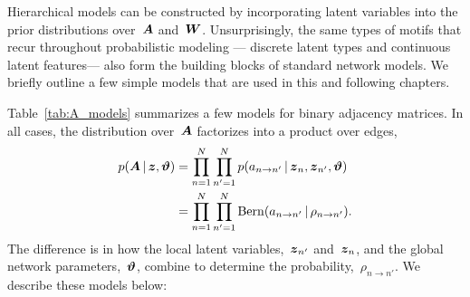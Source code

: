 Hierarchical models can be constructed by incorporating latent
variables into the prior distributions over~$\boldsymbol{A}$ and~$\boldsymbol{W}$.
Unsurprisingly, the same types of motifs that recur throughout
probabilistic modeling --- discrete latent types and continuous
latent features--- also form the building blocks of
standard network models.  We briefly outline a few simple models that
are used in this and following chapters.

Table~\ref{tab:A_models} summarizes a few models for binary adjacency
matrices. In all cases, the distribution over~$\boldsymbol{A}$ factorizes into a
product over edges,
\begin{align*}
  p(\boldsymbol{A} \,|\, \boldsymbol{z}, \boldsymbol{\vartheta})
  &= \prod_{n=1}^N \prod_{n'=1}^N p(a_{n \to n'} \,|\, \boldsymbol{z}_n, \boldsymbol{z}_{n'}, \boldsymbol{\vartheta}) \\
  &= \prod_{n=1}^N \prod_{n'=1}^N \mathrm{Bern}(a_{n \to n'} \,|\, \rho_{n \to n'}).
\end{align*}
The difference is in how the local latent variables,~$\boldsymbol{z}_{n'}$
and~$\boldsymbol{z}_n$, and the global network parameters,~$\boldsymbol{\vartheta}$, combine to
determine the probability,~$\rho_{n \to n'}$. We describe these models
below:
